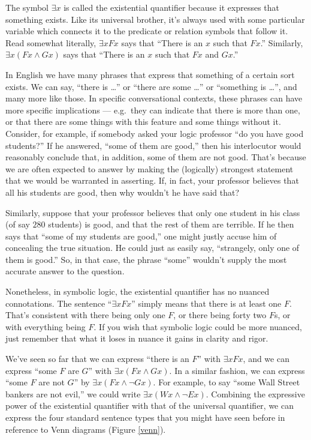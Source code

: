 The symbol $\exists x$ is called the \gls{existential quantifier}
because it expresses that something exists.  Like its universal
brother, it's always used with some particular variable which connects
it to the predicate or relation symbols that follow it.  Read somewhat
literally, $\exists xFx$ says that ``There is an $x$ such that $Fx$.''
Similarly, $\exists x(Fx\wedge Gx)$ says that ``There is an $x$ such
that $Fx$ and $Gx$.''

In English we have many phrases that express that something of a
certain sort exists.  We can say, ``there is \dots '' or ``there are
some \dots '' or ``something is \dots '', and many more like those.
In specific conversational contexts, these phrases can have more
specific implications --- e.g.\ they can indicate that there is more
than one, or that there are some things with this feature and some
things without it.  Consider, for example, if somebody asked your
logic professor ``do you have good students?''  If he answered, ``some
of them are good,'' then his interlocutor would reasonably conclude
that, in addition, some of them are not good.  That's because we are
often expected to answer by making the (logically) strongest statement
that we would be warranted in asserting.  If, in fact, your professor
believes that all his students are good, then why wouldn't he have
said that?

Similarly, suppose that your professor believes that only one student
in his class (of say $280$ students) is good, and that the rest of
them are terrible.  If he then says that ``some of my students are
good,'' one might justly accuse him of concealing the true situation.
He could just as easily say, ``strangely, only one of them is good.''
So, in that case, the phrase ``some'' wouldn't supply the most
accurate answer to the question.

Nonetheless, in symbolic logic, the existential quantifier has no
nuanced connotations.  The sentence ``$\exists xFx$'' simply means
that there is at least one $F$.  That's consistent with there being
only one $F$, or there being forty two $F$s, or with everything being
$F$.  If you wish that symbolic logic could be more nuanced, just
remember that what it loses in nuance it gains in clarity and rigor.

We've seen so far that we can express ``there is an $F$'' with
$\exists xFx$, and we can express ``some $F$ are $G$'' with
$\exists x(Fx\wedge Gx)$.  In a similar fashion, we can express ``some
$F$ are not $G$'' by $\exists x(Fx\wedge\neg Gx)$.  For example, to
say ``some Wall Street bankers are not evil,'' we could write
$\exists x(Wx\wedge\neg Ex)$.  Combining the expressive power of the
existential quantifier with that of the universal quantifier, we can
express the four standard sentence types that you might have seen
before in reference to Venn diagrams (Figure \ref{venn}).

